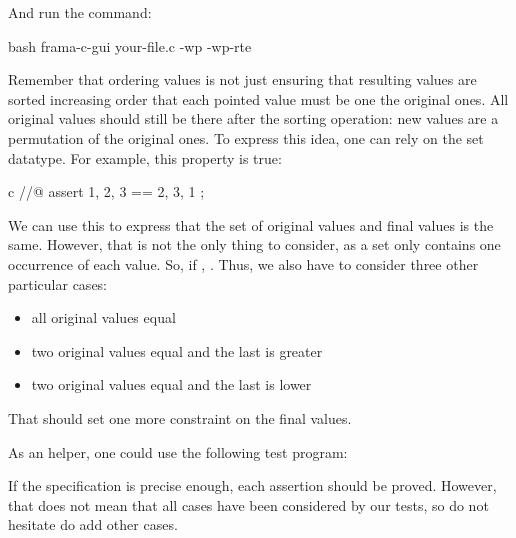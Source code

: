 

And run the command:


\begin{CodeBlock}{bash}
frama-c-gui your-file.c -wp -wp-rte
\end{CodeBlock}


Remember that ordering values is not just ensuring that resulting values
are sorted increasing order that each pointed value must be one the original
ones. All original values should still be there after the sorting operation:
new values are a permutation of the original ones. To express this idea, one
can rely on the set datatype. For example, this property is true:


\begin{CodeBlock}{c}
//@ assert { 1, 2, 3 } == { 2, 3, 1 };
\end{CodeBlock}


We can use this to express that the set of original values and final values
is the same. However, that is not the only thing to consider, as a set only
contains one occurrence of each value. So, if ,
. Thus, we also have to consider three
other particular cases:


\begin{itemize}
\item all original values equal
\item two original values equal and the last is greater
\item two original values equal and the last is lower
\end{itemize}


That should set one more constraint on the final values.


As an helper, one could use the following test program:




If the specification is precise enough, each assertion should be proved.
However, that does not mean that all cases have been considered by our tests,
so do not hesitate do add other cases.
